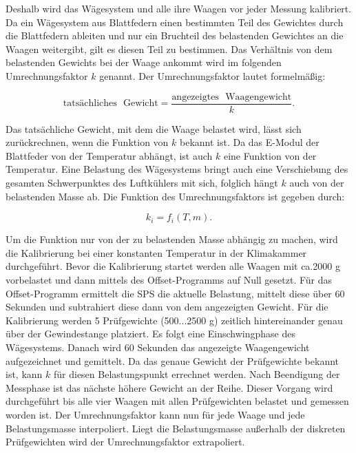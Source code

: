 Deshalb wird das Wägesystem und alle ihre Waagen vor jeder Messung kalibriert. Da ein Wägesystem aus Blattfedern einen bestimmten Teil des Gewichtes durch die Blattfedern ableiten und nur ein Bruchteil des belastenden Gewichtes an die Waagen weitergibt, gilt es diesen Teil zu bestimmen. Das Verhältnis von dem belastenden Gewichts bei der Waage ankommt wird im folgenden Umrechnungsfaktor $k$ genannt. Der Umrechnungsfaktor lautet formelmäßig:

\begin{equation}
\text{tatsächliches ~Gewicht}= \frac{\text{angezeigtes~ Waagengewicht}}{k}.
\label{eq:k}
\end{equation}

Das tatsächliche Gewicht, mit dem die Waage belastet wird, lässt sich zurückrechnen, wenn die Funktion von $k$ bekannt ist. 
Da das E-Modul der Blattfeder von der Temperatur abhängt, ist auch $k$ eine Funktion von der Temperatur. Eine Belastung des Wägesystems bringt auch eine Verschiebung des gesamten Schwerpunktes des Luftkühlers mit sich, folglich hängt $k$ auch von der belastenden Masse ab. Die Funktion des Umrechnungsfaktors ist gegeben durch: 

\begin{equation}
k_i = f_i(T,m). 
\end{equation}

Um die Funktion nur von der zu belastenden Masse abhängig zu machen, wird die Kalibrierung bei einer konstanten Temperatur in der Klimakammer durchgeführt. Bevor die Kalibrierung startet werden alle Waagen mit ca.2000 g vorbelastet und dann mittels des Offset-Programms auf Null gesetzt. Für das Offset-Programm ermittelt die SPS die aktuelle Belastung, mittelt diese über 60 Sekunden und subtrahiert diese dann von dem angezeigten Gewicht.
Für die Kalibrierung werden 5 Prüfgewichte (500...2500 g) zeitlich hintereinander genau über der Gewindestange platziert. Es folgt eine Einschwingphase des Wägesystems. Danach wird 60 Sekunden das angezeigte Waagengewicht aufgezeichnet und gemittelt. Da das genaue Gewicht der Prüfgewichte bekannt ist, kann $k$ für diesen Belastungspunkt errechnet werden. Nach Beendigung der Messphase ist das nächste höhere Gewicht an der Reihe. Dieser Vorgang wird durchgeführt bis alle vier Waagen mit allen Prüfgewichten belastet und gemessen worden ist. 
Der Umrechnungsfaktor kann nun für jede Waage und jede Belastungsmasse interpoliert. Liegt die Belastungsmasse außerhalb der diskreten Prüfgewichten wird der Umrechnungsfaktor extrapoliert.


